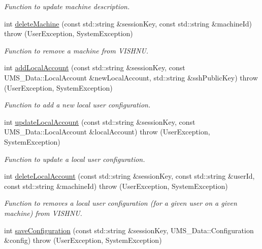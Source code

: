 \begin{DoxyCompactItemize}
\begin{DoxyCompactList}\small\item\em Function to update machine description. \item\end{DoxyCompactList}\item 
int \hyperlink{namespacevishnu_abdd14f47db308fc03655149ac7d93199}{deleteMachine} (const std::string \&sessionKey, const std::string \&machineId)  throw (UserException, SystemException)
\begin{DoxyCompactList}\small\item\em Function to remove a machine from VISHNU. \item\end{DoxyCompactList}\item 
int \hyperlink{namespacevishnu_ab54431ee8c1616ae24b071e9146d39e9}{addLocalAccount} (const std::string \&sessionKey, const UMS\_\-Data::LocalAccount \&newLocalAccount, std::string \&sshPublicKey)  throw (UserException, SystemException)
\begin{DoxyCompactList}\small\item\em Function to add a new local user configuration. \item\end{DoxyCompactList}\item 
int \hyperlink{namespacevishnu_ac51341ab58c1ed606b254262fbc053dc}{updateLocalAccount} (const std::string \&sessionKey, const UMS\_\-Data::LocalAccount \&localAccount)  throw (UserException, SystemException)
\begin{DoxyCompactList}\small\item\em Function to update a local user configuration. \item\end{DoxyCompactList}\item 
int \hyperlink{namespacevishnu_a2b51028779571b21c45a2a75cd362c59}{deleteLocalAccount} (const std::string \&sessionKey, const std::string \&userId, const std::string \&machineId)  throw (UserException, SystemException)
\begin{DoxyCompactList}\small\item\em Function to removes a local user configuration (for a given user on a given machine) from VISHNU. \item\end{DoxyCompactList}\item 
int \hyperlink{namespacevishnu_a2ecc54aee4da202b1caa94dfa6a43d17}{saveConfiguration} (const std::string \&sessionKey, UMS\_\-Data::Configuration \&config)  throw (UserException, SystemException)

\end{DoxyCompactItemize}
